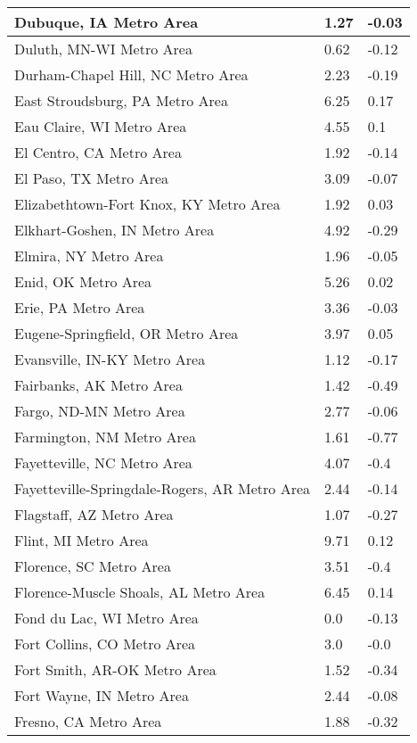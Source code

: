 \documentclass[12pt,oneside, letterpaper]{book}
\begin{document}
\begin{longtable}{| p{} | p{} | p{} |}
    Dubuque, IA Metro Area & 1.27 & -0.03 \\ \hline
    Duluth, MN-WI Metro Area & 0.62 & -0.12 \\ \hline
    Durham-Chapel Hill, NC Metro Area & 2.23 & -0.19 \\ \hline
    East Stroudsburg, PA Metro Area & 6.25 & 0.17 \\ \hline
    Eau Claire, WI Metro Area & 4.55 & 0.1 \\ \hline
    El Centro, CA Metro Area & 1.92 & -0.14 \\ \hline
    El Paso, TX Metro Area & 3.09 & -0.07 \\ \hline
    Elizabethtown-Fort Knox, KY Metro Area & 1.92 & 0.03 \\ \hline
    Elkhart-Goshen, IN Metro Area & 4.92 & -0.29 \\ \hline
    Elmira, NY Metro Area & 1.96 & -0.05 \\ \hline
    Enid, OK Metro Area & 5.26 & 0.02 \\ \hline
    Erie, PA Metro Area & 3.36 & -0.03 \\ \hline
    Eugene-Springfield, OR Metro Area & 3.97 & 0.05 \\ \hline
    Evansville, IN-KY Metro Area & 1.12 & -0.17 \\ \hline
    Fairbanks, AK Metro Area & 1.42 & -0.49 \\ \hline
    Fargo, ND-MN Metro Area & 2.77 & -0.06 \\ \hline
    Farmington, NM Metro Area & 1.61 & -0.77 \\ \hline
    Fayetteville, NC Metro Area & 4.07 & -0.4 \\ \hline
    Fayetteville-Springdale-Rogers, AR Metro Area & 2.44 & -0.14 \\ \hline
    Flagstaff, AZ Metro Area & 1.07 & -0.27 \\ \hline
    Flint, MI Metro Area & 9.71 & 0.12 \\ \hline
    Florence, SC Metro Area & 3.51 & -0.4 \\ \hline
    Florence-Muscle Shoals, AL Metro Area & 6.45 & 0.14 \\ \hline
    Fond du Lac, WI Metro Area & 0.0 & -0.13 \\ \hline
    Fort Collins, CO Metro Area & 3.0 & -0.0 \\ \hline
    Fort Smith, AR-OK Metro Area & 1.52 & -0.34 \\ \hline
    Fort Wayne, IN Metro Area & 2.44 & -0.08 \\ \hline
    Fresno, CA Metro Area & 1.88 & -0.32 \\ \hline

\end{longtable}
\end{document}
